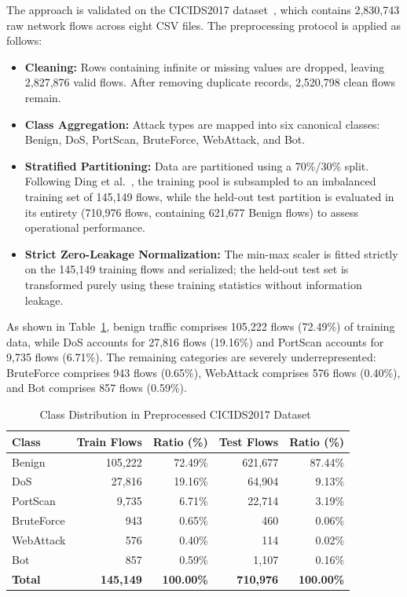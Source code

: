 \documentclass[conference]{IEEEtran}
\begin{document}
The approach is validated on the CICIDS2017 dataset~\cite{sharafaldin2018toward}, which contains 2,830,743 raw network flows across eight CSV files. The preprocessing protocol is applied as follows:
\begin{itemize}\setlength{\itemsep}{2pt}\setlength{\topsep}{2pt}\setlength{\parsep}{0pt}
    \item \textbf{Cleaning:} Rows containing infinite or missing values are dropped, leaving 2,827,876 valid flows. After removing duplicate records, 2,520,798 clean flows remain.
    \item \textbf{Class Aggregation:} Attack types are mapped into six canonical classes: Benign, DoS, PortScan, BruteForce, WebAttack, and Bot.
    \item \textbf{Stratified Partitioning:} Data are partitioned using a 70\%/30\% split. Following Ding et al.~\cite{ding2024tmggan}, the training pool is subsampled to an imbalanced training set of 145,149 flows, while the held-out test partition is evaluated in its entirety (710,976 flows, containing 621,677 Benign flows) to assess operational performance.
    \item \textbf{Strict Zero-Leakage Normalization:} The min-max scaler is fitted strictly on the 145,149 training flows and serialized; the held-out test set is transformed purely using these training statistics without information leakage.
\end{itemize}

As shown in Table~\ref{tab:dataset_distribution}, benign traffic comprises 105,222 flows (72.49\%) of training data, while DoS accounts for 27,816 flows (19.16\%) and PortScan accounts for 9,735 flows (6.71\%). The remaining categories are severely underrepresented: BruteForce comprises 943 flows (0.65\%), WebAttack comprises 576 flows (0.40\%), and Bot comprises 857 flows (0.59\%).

\begin{table}[t]
\centering
\caption{Class Distribution in Preprocessed CICIDS2017 Dataset~\cite{sharafaldin2018toward}}
\label{tab:dataset_distribution}
\begin{tabular}{lrrrr}
\toprule
\textbf{Class} & \textbf{Train Flows} & \textbf{Ratio (\%)} & \textbf{Test Flows} & \textbf{Ratio (\%)} \\
\midrule
Benign      & 105,222 & 72.49\% & 621,677 & 87.44\% \\
DoS         &  27,816 & 19.16\% &  64,904 &  9.13\% \\
PortScan    &   9,735 &  6.71\% &  22,714 &  3.19\% \\
BruteForce  &     943 &  0.65\% &     460 &  0.06\% \\
WebAttack   &     576 &  0.40\% &     114 &  0.02\% \\
Bot         &     857 &  0.59\% &   1,107 &  0.16\% \\
\midrule
\textbf{Total} & \textbf{145,149} & \textbf{100.00\%} & \textbf{710,976} & \textbf{100.00\%} \\
\bottomrule
\end{tabular}
\end{table}
\end{document}
